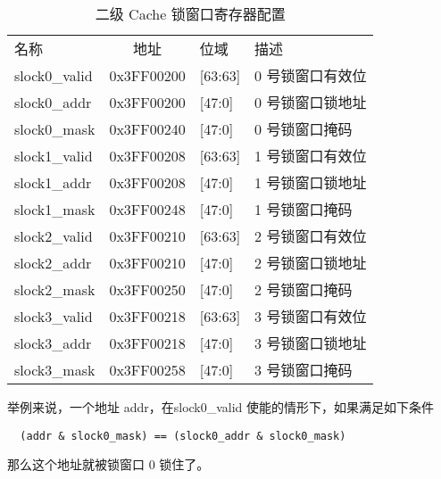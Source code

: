 \begin{table}
  \centering
  \begin{tabular}{|l|c|l|l|} \hline
    名称          & 地址       & 位域    & 描述 \\ \hhline
    slock0\_valid & 0x3FF00200 & [63:63] & 0 号锁窗口有效位 \\
    slock0\_addr  & 0x3FF00200 & [47:0]  & 0 号锁窗口锁地址 \\
    slock0\_mask  & 0x3FF00240 & [47:0]  & 0 号锁窗口掩码 \\ \hline
    slock1\_valid & 0x3FF00208 & [63:63] & 1 号锁窗口有效位 \\
    slock1\_addr  & 0x3FF00208 & [47:0]  & 1 号锁窗口锁地址 \\
    slock1\_mask  & 0x3FF00248 & [47:0]  & 1 号锁窗口掩码 \\ \hline
    slock2\_valid & 0x3FF00210 & [63:63] & 2 号锁窗口有效位 \\
    slock2\_addr  & 0x3FF00210 & [47:0]  & 2 号锁窗口锁地址 \\
    slock2\_mask  & 0x3FF00250 & [47:0]  & 2 号锁窗口掩码 \\ \hline
    slock3\_valid & 0x3FF00218 & [63:63] & 3 号锁窗口有效位 \\
    slock3\_addr  & 0x3FF00218 & [47:0]  & 3 号锁窗口锁地址 \\
    slock3\_mask  & 0x3FF00258 & [47:0]  & 3 号锁窗口掩码    \\ \hline
  \end{tabular}
  \caption{二级 Cache 锁窗口寄存器配置}
  \label{tab:l2cachewinconfig}
\end{table}

举例来说，一个地址 addr，在slock0\_valid 使能的情形下，如果满足如下条件
\begin{verbatim}
  (addr & slock0_mask) == (slock0_addr & slock0_mask)
\end{verbatim}
那么这个地址就被锁窗口 0 锁住了。

